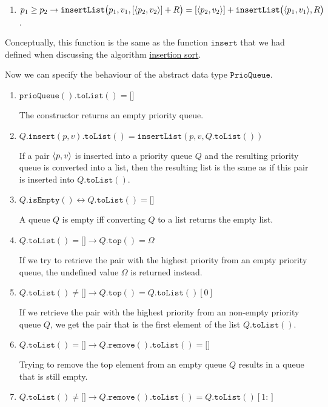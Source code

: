 \begin{Definition}
\begin{enumerate}
\begin{enumerate}
\begin{enumerate}
            \item $p_1 \geq p_2 \rightarrow \texttt{insertList}\bigl(p_1,v_1,[\pair(p_2,v_2)] + R\bigr) = [\pair(p_2,v_2)] + \texttt{insertList}\bigl(\pair(p_1,v_1), R\bigr)$.
            \end{enumerate}
            Conceptually, this function is the same as the function $\mathtt{insert}$ that we had defined when
            discussing the algorithm \hyperref[sec:insertionSort]{insertion sort}.
      \end{enumerate}
      Now we can specify the behaviour of the abstract data type $\texttt{PrioQueue}$.
      \begin{enumerate}
      \item $\texttt{prioQueue}().\texttt{toList}() = \texttt{[]}$

            The constructor returns an empty priority queue.
      \item $Q.\texttt{insert}(p,v).\texttt{toList}() = \texttt{insertList}(p,v,Q.\texttt{toList}())$

            If a pair $\pair(p,v)$ is inserted into a priority queue $Q$ and the resulting priority queue is
            converted into a list, then the resulting list is the same as if this pair is inserted
            into $Q.\texttt{toList}()$.
      \item $Q.\texttt{isEmpty}() \leftrightarrow Q.\texttt{toList}() = \texttt{[]}$

            A queue $Q$ is empty iff converting $Q$ to a list returns the empty list.
      \item $Q.\texttt{toList}() = \texttt{[]} \rightarrow Q.\texttt{top}() = \Omega$

            If we try to retrieve the pair with the highest priority from an empty priority queue, the
            undefined value $\Omega$ is returned instead.
      \item $Q.\texttt{toList}() \not= \texttt{[]} \rightarrow Q.\texttt{top}() = Q.\texttt{toList}()[0]$

            If we retrieve the  pair with the highest priority from an non-empty priority queue $Q$,
            we get the pair that is the first element of the list $Q.\texttt{toList}()$.

      \item $Q.\texttt{toList}() = \texttt{[]} \rightarrow Q.\texttt{remove}().\texttt{toList}() = \texttt{[]}$

            Trying to remove the top element from an empty queue $Q$ results in a queue that is still empty.
      \item $Q.\texttt{toList}() \not= \texttt{[]} \rightarrow Q.\texttt{remove}().\texttt{toList}() =
        Q.\texttt{toList}()[1:]$


\end{enumerate}
\end{enumerate}
\end{Definition}
